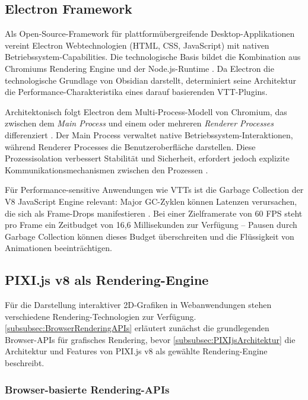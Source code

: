 \subsection{Electron Framework}
\label{subsec:ElectronFramework}

Als Open-Source-Framework für plattformübergreifende Desktop-Applikationen vereint Electron Webtechnologien (\ac{HTML}, \ac{CSS}, JavaScript) mit nativen Betriebssystem-Capabilities. Die technologische Basis bildet die Kombination aus Chromiums Rendering Engine und der Node.js-Runtime \autocite{ElectronWiki2024}. Da Electron die technologische Grundlage von Obsidian darstellt, determiniert seine Architektur die Performance-Charakteristika eines darauf basierenden \ac{VTT}-Plugins.

Architektonisch folgt Electron dem Multi-Process-Modell von Chromium, das zwischen dem \textit{Main Process} und einem oder mehreren \textit{Renderer Processes} differenziert \autocite{ElectronProcessModel2024}. Der Main Process verwaltet native Betriebssystem-Interaktionen, während Renderer Processes die Benutzeroberfläche darstellen. Diese Prozessisolation verbessert Stabilität und Sicherheit, erfordert jedoch explizite Kommunikationsmechanismen zwischen den Prozessen \autocite{ElectronIPC2024}.

Für Performance-sensitive Anwendungen wie \ac{VTT}s ist die Garbage Collection der V8 JavaScript Engine relevant: Major \ac{GC}-Zyklen können Latenzen verursachen, die sich als Frame-Drops manifestieren \autocite{V8MemoryOptimization2016}. Bei einer Zielframerate von 60 \ac{FPS} steht pro Frame ein Zeitbudget von 16,6 Millisekunden zur Verfügung -- Pausen durch Garbage Collection können dieses Budget überschreiten und die Flüssigkeit von Animationen beeinträchtigen.

\subsection{PIXI.js v8 als Rendering-Engine}
\label{subsec:PIXIjs}

Für die Darstellung interaktiver 2D-Grafiken in Webanwendungen stehen verschiedene Rendering-Technologien zur Verfügung. \autoref{subsubsec:BrowserRenderingAPIs} erläutert zunächst die grundlegenden Browser-APIs für grafisches Rendering, bevor \autoref{subsubsec:PIXIjsArchitektur} die Architektur und Features von PIXI.js v8 als gewählte Rendering-Engine beschreibt.

\subsubsection{Browser-basierte Rendering-APIs}
\label{subsubsec:BrowserRenderingAPIs}

